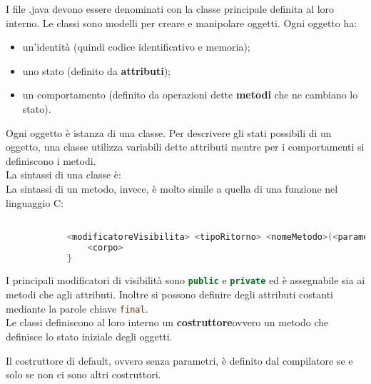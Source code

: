 \documentclass{subfiles}
\begin{document}
    I file .java devono essere denominati con la classe principale definita al loro interno. Le classi sono modelli per creare 
    e manipolare oggetti. Ogni oggetto ha:
    \begin{itemize}
        \item un'identità (quindi codice identificativo e memoria);
        \item uno stato (definito da \textbf{attributi});
        \item un comportamento (definito da operazioni dette \textbf{metodi} che ne cambiano lo stato).
    \end{itemize}
    Ogni oggetto è istanza di una classe. Per descrivere gli stati possibili di un oggetto, una classe utilizza variabili 
    dette  attributi mentre per i comportamenti si definiscono i metodi.\\
    La sintassi di una classe è:
    \\La sintassi di un metodo, invece, è molto simile a quella di una funzione nel linguaggio C:

    \begin{center}
        \begin{lstlisting}[language = java]

            <modificatoreVisibilita> <tipoRitorno> <nomeMetodo>(<parametri>){
                <corpo>
            }

        \end{lstlisting}
    \end{center}
    
    I principali modificatori di visibilità sono \lstinline[language = java]{public} e \lstinline[language = java]{private} ed è
    assegnabile sia ai metodi che agli attributi. Inoltre si possono definire degli attributi costanti mediante la parole chiave
    \lstinline[language = java]{final}.
    \\Le classi definiscono al loro interno un \textbf{costruttore}ovvero un metodo che definisce lo stato iniziale degli oggetti.
    
    Il costruttore di default, ovvero senza parametri, è definito dal compilatore se e solo se non ci sono altri costruttori.
\end{document}
